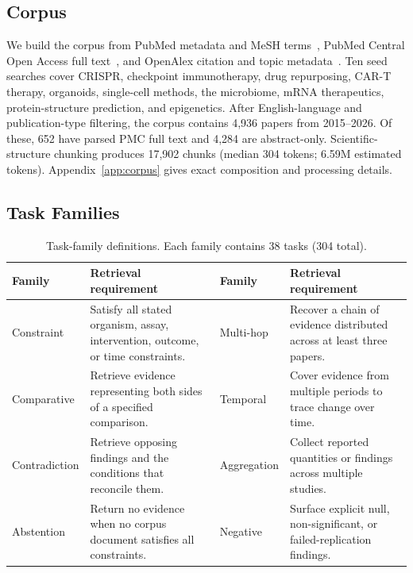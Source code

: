 \documentclass{article}
\begin{document}
\subsection{Corpus}

We build the corpus from PubMed metadata and MeSH terms~\cite{pubmed_nlm}, PubMed Central Open Access full text~\cite{pmc_nlm}, and OpenAlex citation and topic metadata~\cite{openalex2022}. Ten seed searches cover CRISPR, checkpoint immunotherapy, drug repurposing, CAR-T therapy, organoids, single-cell methods, the microbiome, mRNA therapeutics, protein-structure prediction, and epigenetics. After English-language and publication-type filtering, the corpus contains 4,936 papers from 2015--2026. Of these, 652 have parsed PMC full text and 4,284 are abstract-only. Scientific-structure chunking produces 17,902 chunks (median 304 tokens; 6.59M estimated tokens). Appendix~\ref{app:corpus} gives exact composition and processing details.

\subsection{Task Families}

\begin{table}[t]
\centering
\caption{Task-family definitions. Each family contains 38 tasks (304 total).}
\label{tab:families}
\small
\begin{tabular}{@{}lp{}lp{}@{}}
\toprule
\textbf{Family} & \textbf{Retrieval requirement} & \textbf{Family} & \textbf{Retrieval requirement} \\
\midrule
Constraint & Satisfy all stated organism, assay, intervention, outcome, or time constraints. & Multi-hop & Recover a chain of evidence distributed across at least three papers. \\
Comparative & Retrieve evidence representing both sides of a specified comparison. & Temporal & Cover evidence from multiple periods to trace change over time. \\
Contradiction & Retrieve opposing findings and the conditions that reconcile them. & Aggregation & Collect reported quantities or findings across multiple studies. \\
Abstention & Return no evidence when no corpus document satisfies all constraints. & Negative & Surface explicit null, non-significant, or failed-replication findings. \\
\bottomrule
\end{tabular}
\end{table}
\end{document}
